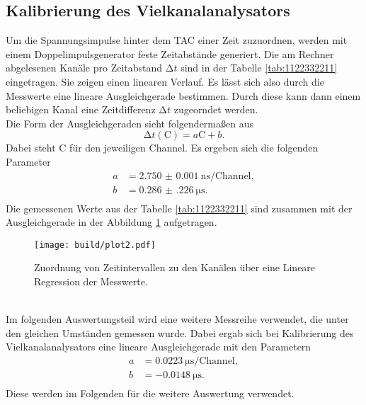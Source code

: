 \subsection{Kalibrierung des Vielkanalanalysators}
Um die Spannungsimpulse hinter dem TAC einer Zeit zuzuordnen, werden mit einem Doppelimpulsgenerator feste Zeitabstände generiert. Die am Rechner abgelesenen Kanäle pro Zeitabstand $\increment t$
sind in der Tabelle \ref{tab:1122332211} eingetragen. Sie zeigen einen linearen Verlauf. Es lässt sich also durch die Messwerte eine lineare Ausgleichgerade bestimmen. Durch diese kann dann einem
beliebigen Kanal eine Zeitdifferenz $\increment t$ zugeorndet werden.
\\
Die Form der Ausgleichgeraden sieht folgendermaßen aus
\begin{equation}
\increment t (\text{C}) = a  \text{C} + b.
\end{equation}
Dabei steht $\text{C}$ für den jeweiligen Channel. 
Es ergeben sich die folgenden Parameter
\begin{align*}
    a &= \SI{2.750(1)}{\nano\second\per{\text{Channel}}},\\
    b &= \SI{0.286(226)}{\micro\second}.\\
\end{align*}
Die gemessenen Werte aus der Tabelle \ref{tab:1122332211} sind zusammen mit der Ausgleichgerade in der Abbildung \ref{fig:333} aufgetragen.
\begin{figure}
    \centering
    \texttt{[image: build/plot2.pdf]}
    \caption{Zuordnung von Zeitintervallen zu den Kanälen über eine Lineare Regression der Messwerte.} 
    \label{fig:333}
\end{figure}
\\
\newline
Im folgenden Auswertungsteil wird eine weitere Messreihe verwendet, die unter den gleichen Umständen gemessen wurde. Dabei ergab sich bei Kalibrierung des Vielkanalanalysators eine lineare 
Ausgleichgerade mit den Parametern
\begin{align*}
    a &= \SI{0.0223}{\micro\second\per{\text{Channel}}},\\
    b &= \SI{-0.0148}{\micro\second}.\\
\end{align*}
Diese werden im Folgenden für die weitere Auswertung verwendet.

